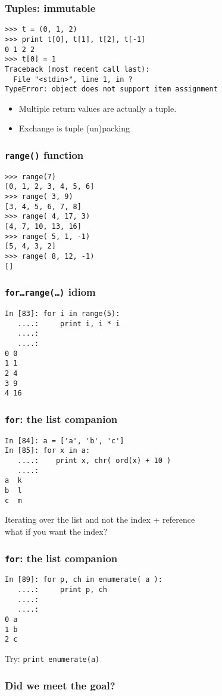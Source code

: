 \documentclass[14pt,compress]{beamer}
\newcounter{time}
\newcommand{\inctime}[1]{\addtocounter{time}{#1}{\tiny \thetime\ m}}
\newcommand{\typ}[1]{\texttt{#1}}
\begin{document}
\begin{frame}[fragile]
  \frametitle{Tuples: immutable}
\begin{lstlisting}
>>> t = (0, 1, 2)
>>> print t[0], t[1], t[2], t[-1] 
0 1 2 2
>>> t[0] = 1
Traceback (most recent call last):
  File "<stdin>", line 1, in ?
TypeError: object does not support item assignment
\end{lstlisting}  
\begin{itemize}
    \item Multiple return values are actually a tuple.
    \item Exchange is tuple (un)packing
\end{itemize}

\end{frame}

\begin{frame}[fragile]
  \frametitle{\typ{range()} function}
  \begin{lstlisting}
>>> range(7)
[0, 1, 2, 3, 4, 5, 6]
>>> range( 3, 9)
[3, 4, 5, 6, 7, 8]
>>> range( 4, 17, 3)
[4, 7, 10, 13, 16]
>>> range( 5, 1, -1)
[5, 4, 3, 2]
>>> range( 8, 12, -1)
[]
  \end{lstlisting}
\end{frame}

\begin{frame}[fragile]
  \frametitle{\typ{for\ldots range(\ldots)} idiom}
  \begin{lstlisting}
In [83]: for i in range(5):
   ....:     print i, i * i
   ....:     
   ....:     
0 0
1 1
2 4
3 9
4 16
\end{lstlisting}
\end{frame}

\begin{frame}[fragile]
  \frametitle{\typ{for}: the list companion}
  
  \begin{lstlisting}
In [84]: a = ['a', 'b', 'c']
In [85]: for x in a:
   ....:    print x, chr( ord(x) + 10 )
   ....:
a  k
b  l
c  m
  \end{lstlisting}
  Iterating over the list and not the index + reference\\
  what if you want the index?
\end{frame}

\begin{frame}[fragile]
  \frametitle{\typ{for}: the list companion}
  \begin{lstlisting}
In [89]: for p, ch in enumerate( a ):
   ....:     print p, ch
   ....:     
   ....:     
0 a
1 b
2 c
  \end{lstlisting}
Try: \typ{print enumerate(a)}
\inctime{20}
\end{frame}


\begin{frame}
  \frametitle{Did we meet the goal?}
  \tableofcontents
\end{frame}
\end{document}
